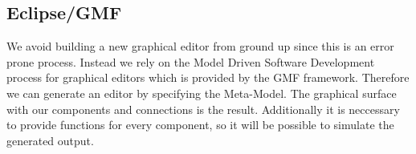 	  \subsection{Eclipse/GMF}
		We avoid building a new graphical editor from ground up since this is an error prone process. Instead we rely on the Model Driven Software Development process for graphical editors which is provided by the GMF framework. Therefore we can generate an editor by specifying the Meta-Model. The graphical surface with our components and connections is the result. Additionally it is neccessary to provide functions for every component, so it will be possible to simulate the generated output.
      